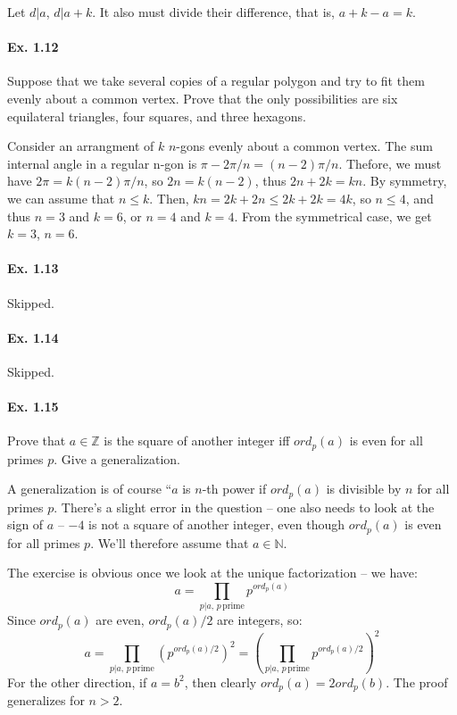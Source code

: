 \documentclass[notitlepage]{article}
\theoremstyle{definition}
\newcommand\Z{\mathbb{Z}}
\begin{document}
Let $d |a$, $d | a+k$. It also must divide their difference, that is, $a+k - a = k$.

\paragraph{Ex. 1.12}

Suppose that we take several copies of a regular polygon and try to fit them evenly
about a common vertex. Prove that the only possibilities are six equilateral triangles,
four squares, and three hexagons.

Consider an arrangment of $k$ $n$-gons evenly about a common
vertex. The sum internal angle in a regular n-gon is $\pi - 2\pi/n =
(n-2)\pi/n$. Thefore, we must have $2\pi = k(n-2)\pi/n$, so $2n =
k(n-2)$, thus $2n + 2k = kn$. By symmetry, we can assume that $n \leq
k$. Then, $kn = 2k + 2n \leq 2k + 2k = 4k$, so $n \leq 4$, and thus $n
= 3$ and $k = 6$, or $n = 4$ and $k = 4$. From the symmetrical case,
we get $k = 3$, $n = 6$.

\paragraph{Ex. 1.13}
Skipped.

\paragraph{Ex. 1.14}
Skipped.

\paragraph{Ex. 1.15}
Prove that $a \in \Z$ is the square of another integer iff
$ord_p(a)$ is even for all primes $p$.  Give a generalization.

A generalization is of course ``$a$ is $n$-th power if $ord_p(a)$ is
divisible by $n$ for all primes $p$. There's a slight error in the
question -- one also needs to look at the sign of $a$ -- $-4$ is not a
square of another integer, even though $ord_p(a)$ is even for all
primes $p$. We'll therefore assume that $a \in \mathbb{N}$.

The exercise is obvious once we look at the unique factorization -- we have:
\begin{equation}
  a = \prod_{p|a,\, p\,\textrm{prime}} p^{ord_p(a)}
\end{equation}
Since $ord_p(a)$ are even, $ord_p(a)/2$ are integers, so:
\begin{equation}
  a = \prod_{p|a,\, p\,\textrm{prime}} (p^{ord_p(a)/2})^2 = \left(\prod_{p|a,\, p\,\textrm{prime}} p^{ord_p(a)/2}\right)^2
\end{equation}
For the other direction, if $a = b^2$, then clearly $ord_p(a) =
2ord_p(b)$. The proof generalizes for $n > 2$.
\end{document}
